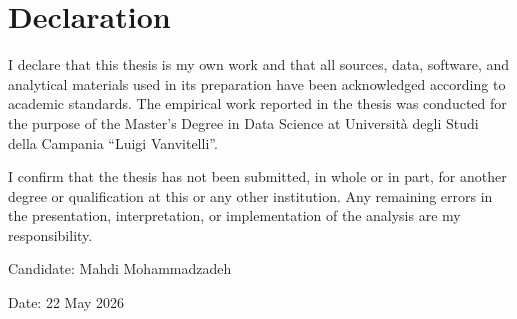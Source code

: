 \chapter*{Declaration}

I declare that this thesis is my own work and that all sources, data, software, and analytical materials used in its preparation have been acknowledged according to academic standards. The empirical work reported in the thesis was conducted for the purpose of the Master's Degree in Data Science at Universit\`a degli Studi della Campania ``Luigi Vanvitelli''.

I confirm that the thesis has not been submitted, in whole or in part, for another degree or qualification at this or any other institution. Any remaining errors in the presentation, interpretation, or implementation of the analysis are my responsibility.

\vspace{2cm}

\noindent Candidate: Mahdi Mohammadzadeh

\vspace{1cm}

\noindent Date: 22 May 2026
